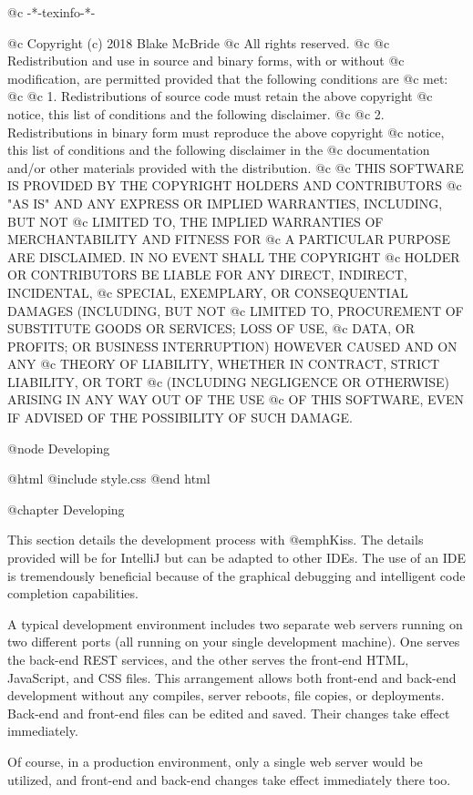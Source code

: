 @c -*-texinfo-*-

@c  Copyright (c) 2018 Blake McBride
@c  All rights reserved.
@c
@c  Redistribution and use in source and binary forms, with or without
@c  modification, are permitted provided that the following conditions are
@c  met:
@c
@c  1. Redistributions of source code must retain the above copyright
@c  notice, this list of conditions and the following disclaimer.
@c
@c  2. Redistributions in binary form must reproduce the above copyright
@c  notice, this list of conditions and the following disclaimer in the
@c  documentation and/or other materials provided with the distribution.
@c
@c  THIS SOFTWARE IS PROVIDED BY THE COPYRIGHT HOLDERS AND CONTRIBUTORS
@c  "AS IS" AND ANY EXPRESS OR IMPLIED WARRANTIES, INCLUDING, BUT NOT
@c  LIMITED TO, THE IMPLIED WARRANTIES OF MERCHANTABILITY AND FITNESS FOR
@c  A PARTICULAR PURPOSE ARE DISCLAIMED. IN NO EVENT SHALL THE COPYRIGHT
@c  HOLDER OR CONTRIBUTORS BE LIABLE FOR ANY DIRECT, INDIRECT, INCIDENTAL,
@c  SPECIAL, EXEMPLARY, OR CONSEQUENTIAL DAMAGES (INCLUDING, BUT NOT
@c  LIMITED TO, PROCUREMENT OF SUBSTITUTE GOODS OR SERVICES; LOSS OF USE,
@c  DATA, OR PROFITS; OR BUSINESS INTERRUPTION) HOWEVER CAUSED AND ON ANY
@c  THEORY OF LIABILITY, WHETHER IN CONTRACT, STRICT LIABILITY, OR TORT
@c  (INCLUDING NEGLIGENCE OR OTHERWISE) ARISING IN ANY WAY OUT OF THE USE
@c  OF THIS SOFTWARE, EVEN IF ADVISED OF THE POSSIBILITY OF SUCH DAMAGE.


@node Developing

@html
@include style.css
@end html

@chapter Developing

This section details the development process with @emph{Kiss}.  The
details provided will be for IntelliJ but can be adapted to other
IDEs.  The use of an IDE is tremendously beneficial because of the
graphical debugging and intelligent code completion capabilities.

A typical development environment includes two separate web servers running
on two different ports (all running on your single development machine).  One serves the back-end REST services, and
the other serves the front-end HTML, JavaScript, and CSS files.  This
arrangement allows both front-end and back-end development without any
compiles, server reboots, file copies, or deployments.  Back-end and
front-end files can be edited and saved.  Their changes take effect
immediately.

Of course, in a production environment, only a single web server would be
utilized, and front-end and back-end changes take effect immediately
there too.

